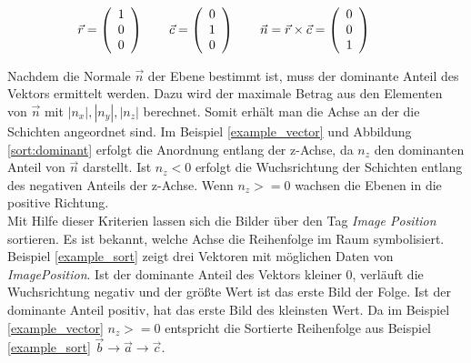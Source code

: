\begin{equation}
\vec{r}=\left(\begin{array}{c} 1 \\ 0 \\ 0 \end{array}\right) \qquad
\vec{c}=\left(\begin{array}{c} 0 \\ 1 \\ 0 \end{array}\right) \qquad
\vec{n}=\vec{r}\times\vec{c}=\left(\begin{array}{c} 0 \\ 0 \\ 1 \end{array}\right) \qquad
\vspace{0.5cm}
\label{example_vector}
\end{equation}

Nachdem die Normale $\vec{n}$ der Ebene bestimmt ist, muss der dominante Anteil des Vektors ermittelt werden. Dazu wird der maximale Betrag aus den Elementen von $ \vec{n}$ mit $|n_x|, |n_y|, |n_z|$ berechnet. Somit erhält man die Achse an der die Schichten angeordnet sind. Im Beispiel \ref{example_vector} und Abbildung \ref{sort:dominant} erfolgt die Anordnung entlang der z-Achse, da $n_z$ den dominanten Anteil von $\vec{n}$ darstellt. Ist $n_z < 0$ erfolgt die Wuchsrichtung der Schichten entlang des negativen Anteils der z-Achse. Wenn $n_z >= 0$ wachsen die Ebenen in die positive Richtung.\\
Mit Hilfe dieser Kriterien lassen sich die Bilder über den Tag \textit{Image Position} sortieren. Es ist bekannt, welche Achse die Reihenfolge im Raum symbolisiert. Beispiel \ref{example_sort} zeigt drei Vektoren mit möglichen Daten von \textit{ImagePosition}. Ist der dominante Anteil des Vektors kleiner 0, verläuft die Wuchsrichtung negativ und der größte Wert ist das erste Bild der Folge. Ist der dominante Anteil positiv, hat das erste Bild des kleinsten Wert. Da im Beispiel \ref{example_vector} $n_z >= 0$ entspricht die Sortierte Reihenfolge aus Beispiel \ref{example_sort} $\vec{b}\rightarrow\vec{a}\rightarrow\vec{c}$.

